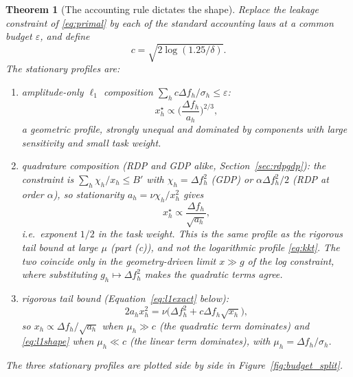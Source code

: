\documentclass[10pt,twocolumn,letterpaper]{article}
\theoremstyle{plain}
\newtheorem{theorem}{Theorem}
\theoremstyle{definition}
\begin{document}
\begin{theorem}[The accounting rule dictates the shape]
\label{th:shape}
Replace the leakage constraint of \eqref{eq:primal} by each of the standard
accounting laws at a common budget $\varepsilon$, and define
\begin{equation}
c=\sqrt{2\log(1.25/\delta)}.
\label{eq:tailconst}
\end{equation}
The stationary profiles are:
\begin{enumerate}
\item[(a)] \emph{amplitude-only $\ell_1$ composition}
$\sum_h c\Delta f_h/\sigma_h\le\varepsilon$:
\begin{equation}
x_h^{\star}\propto\Big(\frac{\Delta f_h}{a_h}\Big)^{2/3},
\label{eq:l1shape}
\end{equation}
a geometric profile, strongly unequal and dominated by components with large
sensitivity and small task weight.
\item[(b)] \emph{quadrature composition} (RDP and GDP alike,
Section~\ref{sec:rdpgdp}): the constraint is $\sum_h\chi_h/x_h\le B'$ with
$\chi_h=\Delta f_h^2$ (GDP) or $\alpha\Delta f_h^2/2$ (RDP at order $\alpha$),
so stationarity $a_h=\nu\chi_h/x_h^2$ gives
\begin{equation}
x_h^{\star}\propto\frac{\Delta f_h}{\sqrt{a_h}},
\label{eq:quadshape}
\end{equation}
i.e.\ exponent $1/2$ in the task weight. This is the same profile as the rigorous
tail bound at large $\mu$ (part (c)), and \emph{not} the logarithmic profile
\eqref{eq:kkt}. The two coincide only in the geometry-driven limit $x\gg g$ of
the log constraint, where substituting $g_h\mapsto\Delta f_h^2$ makes the
quadratic terms agree.
\item[(c)] \emph{rigorous tail bound} (Equation~\eqref{eq:l1exact} below):
\begin{equation}
2a_hx_h^{2}=\nu\big(\Delta f_h^{2}+c\Delta f_h\sqrt{x_h}\big),
\label{eq:l1exactshape}
\end{equation}
so $x_h\propto\Delta f_h/\sqrt{a_h}$ when $\mu_h\gg c$ (the quadratic term
dominates) and \eqref{eq:l1shape} when $\mu_h\ll c$ (the linear term dominates),
with $\mu_h=\Delta f_h/\sigma_h$.
\end{enumerate}
The three stationary profiles are plotted side by side in
Figure~\ref{fig:budget_split}.
\end{theorem}
\end{document}

